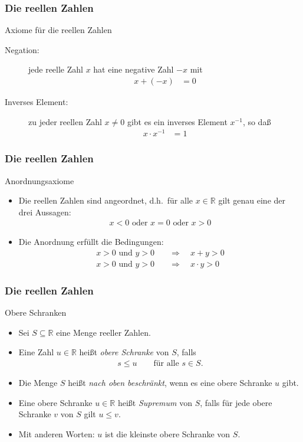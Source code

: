 \documentclass{beamer}
\renewcommand{\emph}[1]{{\textcolor{solarizedRed}{\itshape #1}}}
\newcommand\RR{\mathbb R}
\renewcommand{\ae}{\"a}
\newcommand{\ue}{\"u}
\newcommand{\mytitle}{Die reellen Zahlen}
\begin{document}
\begin{frame}\frametitle{\mytitle}
	\begin{block}{Axiome f\ue r die reellen Zahlen}
		\begin{description}
			\item[Negation:] jede reelle Zahl $x$ hat eine negative Zahl $-x$ mit
					\begin{align*}
						x+(-x)&=0
					\end{align*}
			\item[Inverses Element:]	
				zu jeder reellen Zahl $x\neq0$ gibt es ein inverses Element $x^{-1}$, so da\ss\
				\begin{align*}
					x\cdot x^{-1}&=1
				\end{align*}
		\end{description}
	\end{block}
\end{frame}

\begin{frame}\frametitle{\mytitle}
	\begin{block}{Anordnungsaxiome}
	\begin{itemize}
	\item Die reellen Zahlen sind angeordnet, d.h.\ f\ue r alle $x\in\RR$ gilt genau eine der drei Aussagen:
		\begin{align*}
			x<0\mbox{ oder }x=0\mbox{ oder }x>0
		\end{align*}
	\item Die Anordnung erf\ue llt die Bedingungen:
		\begin{align*}
			x>0\mbox{ und }y>0\quad&\Rightarrow\quad x+y>0\\
			x>0\mbox{ und }y>0\quad&\Rightarrow\quad x\cdot y>0
		\end{align*}
	\end{itemize}
	\end{block}
\end{frame}

\begin{frame}\frametitle{\mytitle}
	\begin{block}{Obere Schranken}
	\begin{itemize}
		\item Sei $S\subseteq\RR$ eine Menge reeller Zahlen.
		\item Eine Zahl $u\in\RR$ hei\ss t \emph{obere Schranke} von $S$, falls
			\begin{align*}
				s\leq u\qquad\mbox{f\ue r alle }s\in S.
			\end{align*}
		\item Die Menge $S$ hei\ss t \emph{nach oben beschr\ae nkt}, wenn es eine obere Schranke $u$ gibt.
		\item Eine obere Schranke $u\in\RR$ hei\ss t \emph{Supremum} von $S$, falls f\ue r jede obere Schranke $v$ von $S$ gilt $u\leq v$.
		\item Mit anderen Worten: $u$ ist die \alert{kleinste} obere Schranke von $S$.
	\end{itemize}
	\end{block}
\end{frame}
\end{document}
